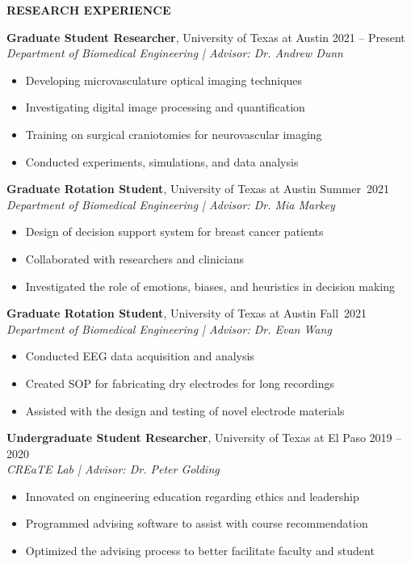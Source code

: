 \documentclass[11pt]{article}
\newcommand{\sectionheading}[1]{%
    \vspace{1.6ex}%
    {\large\bfseries\MakeUppercase{#1}}\par\vspace{0.8ex}%
  }
\newcommand{\sectionheading}[1]{%
    \vspace{1.6ex}%
    {\large\bfseries{\HeadingFace \MakeUppercase{#1}}}\par\vspace{0.8ex}%
  }
\begin{document}
\sectionheading{Research Experience}

\textbf{Graduate Student Researcher}, University of Texas at Austin \hfill 2021 -- Present\\
\textit{Department of Biomedical Engineering \;|\; Advisor: Dr. Andrew Dunn}
\begin{itemize}
  \item Developing microvasculature optical imaging techniques
  \item Investigating digital image processing and quantification
  \item Training on surgical craniotomies for neurovascular imaging
  \item Conducted experiments, simulations, and data analysis
\end{itemize}

\textbf{Graduate Rotation Student}, University of Texas at Austin \hfill Summer~2021\\
\textit{Department of Biomedical Engineering \;|\; Advisor: Dr. Mia Markey}
\begin{itemize}
  \item Design of decision support system for breast cancer patients
  \item Collaborated with researchers and clinicians
  \item Investigated the role of emotions, biases, and heuristics in decision making
\end{itemize}

\textbf{Graduate Rotation Student}, University of Texas at Austin \hfill Fall~2021\\
\textit{Department of Biomedical Engineering \;|\; Advisor: Dr. Evan Wang}
\begin{itemize}
  \item Conducted EEG data acquisition and analysis
  \item Created SOP for fabricating dry electrodes for long recordings
  \item Assisted with the design and testing of novel electrode materials
\end{itemize}

\textbf{Undergraduate Student Researcher}, University of Texas at El Paso \hfill 2019 -- 2020\\
\textit{CREaTE Lab \;|\; Advisor: Dr. Peter Golding}
\begin{itemize}
  \item Innovated on engineering education regarding ethics and leadership
  \item Programmed advising software to assist with course recommendation
  \item Optimized the advising process to better facilitate faculty and student
\end{itemize}
\end{document}
